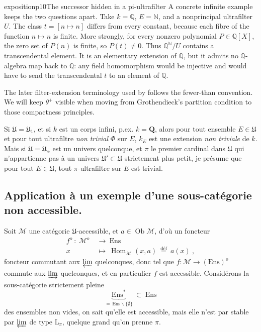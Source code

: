 \begin{dcomment}{exposition}{p10}{The successor hidden in a pi-ultrafilter}
A concrete infinite example keeps the two questions apart. Take $k=\mathbb Q$, $E=\mathbb N$, and a nonprincipal ultrafilter $U$. The class $t=[n\mapsto n]$ differs from every constant, because each fibre of the function $n\mapsto n$ is finite. More strongly, for every nonzero polynomial $P\in\mathbb Q[X]$, the zero set of $P(n)$ is finite, so $P(t)\ne0$. Thus $\mathbb Q^\mathbb N/U$ contains a transcendental element. It is an elementary extension of $\mathbb Q$, but it admits no $\mathbb Q$-algebra map back to $\mathbb Q$: any field homomorphism would be injective and would have to send the transcendental $t$ to an element of $\mathbb Q$.

The later filter-extension terminology used by \citet[Definition~2.3]{BrookeTaylorRosicky2017} follows the fewer-than convention. We will keep $\theta^+$ visible when moving from Grothendieck's partition condition to those compactness principles.
\end{dcomment}


Si $\mathfrak{U}=\mathfrak{U}_1$, et si $k$ est un corps infini, p.ex. $k=\mathbf{Q}$, alors pour tout ensemble $E\in\mathfrak{U}$ et pour tout ultrafiltre \textit{non trivial} $\Phi$ sur $E$, $k_E$ est une extension \textit{non triviale} de $k$. Mais si $\mathfrak{U}=\mathfrak{U}_\alpha$ est un univers quelconque, et $\pi$ le premier cardinal dans $\mathfrak{U}$ qui n'appartienne pas à un univers $\mathfrak{U}'\subset\mathfrak{U}$ strictement plus petit, je présume que pour tout $E\in\mathfrak{U}$, tout $\pi$-ultrafiltre sur $E$ est trivial. %


\subsection*{Application à un exemple d'une sous-catégorie non accessible.}

Soit $\mathcal{M}$ une catégorie $\mathfrak{U}$-accessible, et $a\in\operatorname{Ob}\mathcal{M}$, d'où un foncteur
\[
\begin{aligned}
f^o\ :\ \mathcal{M}^o\ &\longrightarrow\ \mathrm{Ens}\\
x\ &\longmapsto\ \operatorname{Hom}_{\mathcal{M}}(x,a)\ \overset{\text{déf}}{=}\ a(x)\ ,
\end{aligned}
\]
foncteur commutant aux $\mathop{\underleftarrow{\mathrm{lim}}}$ quelconques, donc tel que $f:\mathcal{M}\longrightarrow(\mathrm{Ens})^o$ commute aux $\mathop{\underrightarrow{\mathrm{lim}}}$ quelconques, et en particulier $f$ est accessible. Considérons la sous-catégorie strictement pleine
\[
\underbrace{\mathrm{Ens}^*}_{=\,\mathrm{Ens}\backslash\{\emptyset\}}\ \subset\ \mathrm{Ens}
\]
des ensembles non vides, on sait qu'elle est accessible, mais elle n'est par stable par $\mathop{\underleftarrow{\mathrm{lim}}}$ de type $\mathrm{L}_\pi$, quelque grand qu'on prenne $\pi$. %

